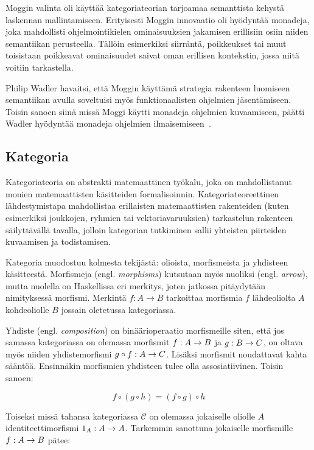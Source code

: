 \documentclass[finnish]{tktltiki2}
\begin{document}
Moggin valinta oli käyttää kategoriateorian tarjoamaa semanttista kehystä laskennan mallintamiseen.
Erityisesti Moggin innovaatio oli hyödyntää monadeja, joka mahdollisti ohjelmointikielen
ominaisuuksien jakamisen erillisiin osiin niiden semantiikan perusteella. Tällöin esimerkiksi
siirräntä, poikkeukset tai muut toisistaan poikkeavat ominaisuudet saivat oman erillisen kontekstin,
jossa niitä voitiin tarkastella.

Philip Wadler havaitsi, että Moggin käyttämä strategia rakenteen luomiseen semantiikan avulla
soveltuisi myös funktionaalisten ohjelmien jäsentämiseen. Toisin sanoen siinä missä Moggi käytti
monadeja ohjelmien kuvaamiseen, päätti Wadler hyödyntää monadeja ohjelmien
ilmaisemiseen~\cite{cm90,teofp92}.

\subsection{Kategoria}

Kategoriateoria on abstrakti matemaattinen työkalu, joka on mahdollistanut monien matemaattisten
käsitteiden formalisoinnin. Kategoriateoreettinen lähdestymistapa mahdollistaa erillaisten
matemaattisten rakenteiden (kuten esimerkiksi joukkojen, ryhmien tai vektoriavaruuksien) tarkastelun
rakenteen säilyttävällä tavalla, jolloin kategorian tutkiminen sallii yhteisten piirteiden
kuvaamisen ja todistamisen.

Kategoria muodostuu kolmesta tekijästä: olioista, morfismeista ja yhdisteen käsitteestä. Morfismeja
(engl. \emph{morphisms}) kutsutaan myös nuoliksi (engl. \emph{arrow}), mutta nuolella on Haskellissa
eri merkitys, joten jatkossa pitäydytään nimityksessä morfismi. Merkintä $f : A \rightarrow B$
tarkoittaa morfismia $f$ lähdeoliolta $A$ kohdeoliolle $B$ jossain oletetussa kategoriassa.

Yhdiste (engl. \emph{composition}) on binäärioperaatio morfismeille siten, että jos samassa
kategoriassa on olemassa morfismit $f : A \rightarrow B$ ja $g : B \rightarrow C$, on oltava myös niiden
yhdistemorfismi $g \circ f : A \rightarrow C$. Lisäksi morfismit noudattavat kahta sääntöä. Ensinnäkin
morfismien yhdisteen tulee olla assosiatiivinen. Toisin sanoen:

$$f \circ (g \circ h) = (f \circ g) \circ h$$

Toiseksi missä tahansa kategoriassa $\mathcal{C}$ on olemassa jokaiselle oliolle $A$
identiteettimorfismi $1_A : A \rightarrow A$. Tarkemmin sanottuna jokaiselle morfismille $f : A \rightarrow B$
pätee:
\end{document}
